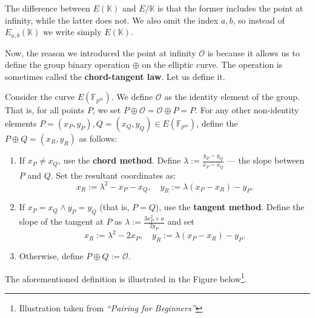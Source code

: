 \documentclass[../lecture-notes-148x210.tex]{subfiles}
\begin{document}
\begin{remark}
    The difference between $E(\mathbb{K})$ and $E/\mathbb{K}$ is that the former includes the point at infinity, while the latter does not. We also omit the index $a,b$, so instead of $E_{a,b}(\mathbb{K})$ we write simply $E(\mathbb{K})$.
\end{remark}

Now, the reason we introduced the point at infinity $\mathcal{O}$ is because it allows us to define the group binary operation $\oplus$ on the elliptic curve. The operation is sometimes called the \textbf{chord-tangent law}. Let us define it.

\vspace{-0.5em}

\begin{definition}
    Consider the curve $E(\mathbb{F}_{p^m})$. We define $\mathcal{O}$ as the identity element of the group. That is, for all points $P$, we set $P \oplus \mathcal{O} = \mathcal{O} \oplus P = P$. For any other non-identity elements $P=(x_P,y_P),Q=(x_Q,y_Q) \in E(\mathbb{F}_{p^m})$, define the $P\oplus Q = (x_R,y_R)$ as follows:
    \begin{enumerate}
        \item If $x_P\neq x_Q$, use the \textbf{chord method}. Define $\lambda := \frac{y_P-y_Q}{x_P-x_Q}$ --- the slope between $P$ and $Q$. Set the resultant coordinates as:
        \begin{equation*}
            x_R := \lambda^2 - x_P - x_Q, \quad y_R := \lambda(x_P-x_R)-y_P.
        \end{equation*}
        \item If $x_P=x_Q \wedge y_P=y_Q$ (that is, $P=Q$), use the \textbf{tangent method}. Define the slope of the tangent at $P$ as $\lambda := \frac{3x_P^2+a}{2y_P}$ and set
        \begin{equation*}
            x_R := \lambda^2 - 2x_P, \quad y_R := \lambda(x_P-x_R)-y_P.
        \end{equation*}
        \item Otherwise, define $P \oplus Q := \mathcal{O}$.
    \end{enumerate}
\end{definition}

The aforementioned definition is illustrated in the Figure below\footnote{Illustration taken from \textit{``Pairing for Beginners''}}.
\end{document}
